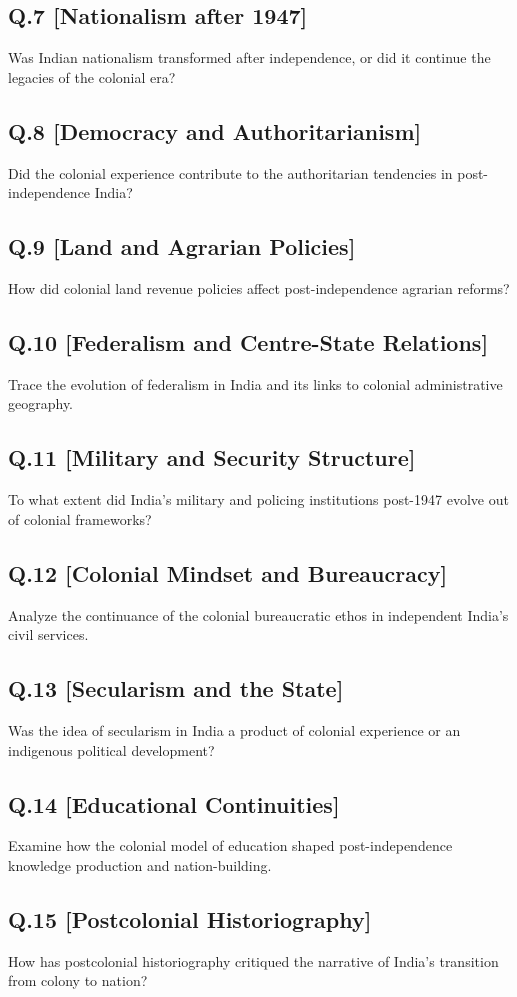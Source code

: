 \subsection*{Q.7 [Nationalism after 1947]}
Was Indian nationalism transformed after independence, or did it continue the legacies of the colonial era?

\subsection*{Q.8 [Democracy and Authoritarianism]}
Did the colonial experience contribute to the authoritarian tendencies in post-independence India?

\subsection*{Q.9 [Land and Agrarian Policies]}
How did colonial land revenue policies affect post-independence agrarian reforms?

\subsection*{Q.10 [Federalism and Centre-State Relations]}
Trace the evolution of federalism in India and its links to colonial administrative geography.

\subsection*{Q.11 [Military and Security Structure]}
To what extent did India’s military and policing institutions post-1947 evolve out of colonial frameworks?

\subsection*{Q.12 [Colonial Mindset and Bureaucracy]}
Analyze the continuance of the colonial bureaucratic ethos in independent India's civil services.

\subsection*{Q.13 [Secularism and the State]}
Was the idea of secularism in India a product of colonial experience or an indigenous political development?

\subsection*{Q.14 [Educational Continuities]}
Examine how the colonial model of education shaped post-independence knowledge production and nation-building.

\subsection*{Q.15 [Postcolonial Historiography]}
How has postcolonial historiography critiqued the narrative of India's transition from colony to nation?
